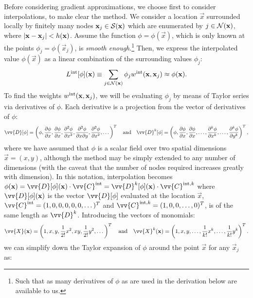 Before considering gradient approximations, we choose first to consider interpolations, to make clear the method. We consider a location $\vec{x}$ surrounded locally by finitely many nodes $\vec{x}_j \in \cl{S}(\vec{x})$ which are enumerated by $j \in \cl{N}(\vec{x})$, where $\abs{\vec{x} - \vec{x}_j} < h(\vec{x})$. Assume the function $\phi = \phi(\vec{x})$, which is only known at the points $\phi_j = \phi(\vec{x}_j)$, is \emph{smooth enough}.\footnote{Such that as many derivatives of $\phi$ as are used in the derivation below are available to us.} Then, we express the interpolated value $\phi(\vec{x})$ as a linear combination of the surrounding values $\phi_j$:
\begin{equation} \label{eqn:L}
L^{\rm{int}}[\phi](\vec{x}) \equiv \sum_{j \in \cl{N}(\vec{x})} \phi_j w^{\rm{int}}(\vec{x}, \vec{x}_j) \approx \phi(\vec{x}).
\end{equation}
To find the weights $w^{\rm{int}}(\vec{x}, \vec{x}_j)$, we will be evaluating $\phi_j$ by means of Taylor series via derivatives of $\phi$. Each derivative is a projection from the vector of derivatives of $\phi$:
\begin{equation}
\vv{D}[\phi] = \left(\phi, \pdv{\phi}{x}, \pdv{\phi}{x}, \pdv[2]{\phi}{x}, \pdv[2]{\phi}{x}{y}, \pdv[2]{\phi}{x}, \dots \right)^T
\quad \text{and} \quad
\vv{D}^k[\phi] = \left(\phi, \pdv{\phi}{x}, \pdv{\phi}{x}, \dots, \pdv[k]{\phi}{x}, \dots, \pdv[k]{\phi}{y} \right)^T,
\end{equation}
where we have assumed that $\phi$ is a scalar field over two spatial dimensions $\vec{x}=(x, y)$, although the method may be simply extended to any number of dimensions (with the caveat that the number of nodes required increases greatly with dimension). In this notation, interpolation becomes $\phi(\vec{x}) = \vv{D}[\phi](\vec{x}) \cdot \vv{C}^{\rm{int}} = \vv{D}^k[\phi](\vec{x}) \cdot \vv{C}^{\rm{int}, k}$ where $\vv{D}[\phi](\vec{x})$ is the vector $\vv{D}[\phi]$ evaluated at the location $\vec{x}$, $\vv{C}^{\rm{int}} = (1, 0, 0, 0, 0, 0, \dots)^T$ and $\vv{C}^{\rm{int}, k} = (1, 0, 0, \dots, 0)^T$, is of the same length as $\vv{D}^k$. Introducing the vectors of monomials:
\begin{equation}
\vv{X}(\vec{x}) = \left(1, x, y, \frac{1}{2!} x^2, xy, \frac{1}{2!} y^2, \dots \right)^T
\quad \text{and} \quad
\vv{X}^k(\vec{x}) = \left(1, x, y, \dots, \frac{1}{k!} x^k, \dots, \frac{1}{k!} y^k \right)^T.
\end{equation}
we can simplify down the Taylor expansion of $\phi$ around the point $\vec{x}$ for any $\vec{x}_j$ as:
